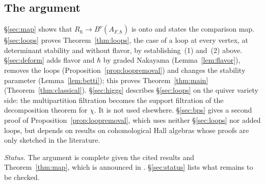 \documentclass[11pt]{amsart}
\begin{document}
\subsection{The argument}\label{ss:route}
\S\ref{sec:map} shows that $R_\hbar\to B^\nu(A_{F,\hbar})$ is onto and states
the comparison map.  \S\ref{sec:loops} proves Theorem~\ref{thm:loops}, the case
of a loop at every vertex, at determinant stability and without flavor, by
establishing~(1) and~(2) above.  \S\ref{sec:deform} adds flavor and $\hbar$ by
graded Nakayama (Lemma~\ref{lem:flavor}), removes the loops
(Proposition~\ref{prop:loopremoval}) and changes the stability parameter
(Lemma~\ref{lem:betti}); this proves Theorem~\ref{thm:main}
(Theorem~\ref{thm:classical}).  \S\ref{sec:higgs} describes \S\ref{sec:loops}
on the quiver variety side: the multipartition filtration becomes the support
filtration of the decomposition theorem for $\chi$.  It is not used
elsewhere.  \S\ref{sec:bps} gives a second proof of
Proposition~\ref{prop:loopremoval}, which uses neither \S\ref{sec:loops} nor
added loops, but depends on results on cohomological Hall algebras whose
proofs are only sketched in the literature.

\emph{Status.}  The argument is complete given the cited results and
Theorem~\ref{thm:map}, which is announced in \cite{bottaQuasimapCritical2026}.
\S\ref{sec:status} lists what remains to be checked.
\end{document}
